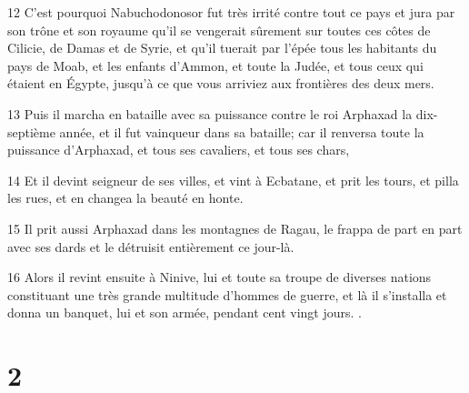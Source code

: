 \par 12 C'est pourquoi Nabuchodonosor fut très irrité contre tout ce pays et jura par son trône et son royaume qu'il se vengerait sûrement sur toutes ces côtes de Cilicie, de Damas et de Syrie, et qu'il tuerait par l'épée tous les habitants du pays de Moab, et les enfants d'Ammon, et toute la Judée, et tous ceux qui étaient en Égypte, jusqu'à ce que vous arriviez aux frontières des deux mers.
\par 13 Puis il marcha en bataille avec sa puissance contre le roi Arphaxad la dix-septième année, et il fut vainqueur dans sa bataille; car il renversa toute la puissance d'Arphaxad, et tous ses cavaliers, et tous ses chars,
\par 14 Et il devint seigneur de ses villes, et vint à Ecbatane, et prit les tours, et pilla les rues, et en changea la beauté en honte.
\par 15 Il prit aussi Arphaxad dans les montagnes de Ragau, le frappa de part en part avec ses dards et le détruisit entièrement ce jour-là.
\par 16 Alors il revint ensuite à Ninive, lui et toute sa troupe de diverses nations constituant une très grande multitude d'hommes de guerre, et là il s'installa et donna un banquet, lui et son armée, pendant cent vingt jours. .

\chapter{2}

